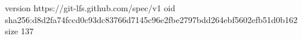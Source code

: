 version https://git-lfs.github.com/spec/v1
oid sha256:d8d2fa74fccd0c93dc83766d7145c96e2fbe2797bdd264ebf5602efb51d0b162
size 137

